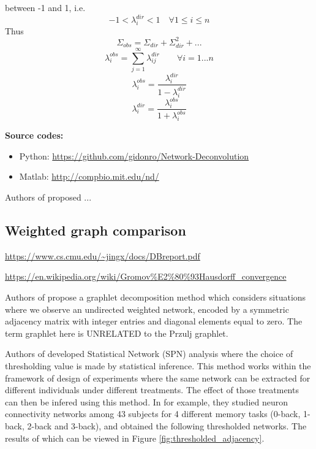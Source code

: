 \documentclass{article}
\begin{document}
between -1 and 1, i.e. 
\begin{equation}
    -1 < \lambda^{dir}_i < 1 \quad \forall 1 \le i \le n
\end{equation}
Thus 
\begin{equation}
    \Sigma_{obs} = \Sigma_{dir} + \Sigma_{dir}^2 + ...
\end{equation}
\begin{equation}
    \lambda_i^{obs} = \sum_{j=1}^{\infty} \lambda^{dir}_{ij} \quad\quad \forall i = 1 ... n
\end{equation}
\begin{equation}
    \lambda_i^{obs} = \frac{\lambda_i^{dir}}{1 - \lambda_i^{dir}}
\end{equation}
\begin{equation}
   \lambda_i^{dir} = \frac{\lambda_i^{obs}}{1 + \lambda_i^{obs}} 
\end{equation}

\textbf{Source codes:} 
\begin{itemize}
    \item Python: \url{https://github.com/gidonro/Network-Deconvolution} 
    \item Matlab: \url{http://compbio.mit.edu/nd/}
\end{itemize}

Authors of \cite{sun2015improving} proposed ...
\subsection{Weighted graph comparison}
\url{https://www.cs.cmu.edu/~jingx/docs/DBreport.pdf}

\url{https://en.wikipedia.org/wiki/Gromov%E2%80%93Hausdorff_convergence}

Authors of \cite{soufiani2012graphlet} propose a graphlet
decomposition method
which considers situations where we observe an undirected
weighted network, encoded by a symmetric adjacency matrix with integer entries and diagonal
elements equal to zero. The term graphlet here is UNRELATED to the
Przulj graphlet.

Authors of \cite{ginestet2011statistical} developed Statistical Network (SPN) analysis
where the choice of thresholding value is made by statistical inference.
This method works within the framework of design of experiments where the same
network can be extracted for different individuals under different treatments. The
effect of those treatments can then be infered using this method.
In \cite{ginestet2011statistical} for example, they studied neuron connectivity
networks among 43 subjects for 4 different memory tasks (0-back, 1-back, 2-back and
3-back), and obtained the following thresholded networks. The results of which can 
be viewed in Figure \ref{fig:thresholded_adjacency}.
\end{document}
